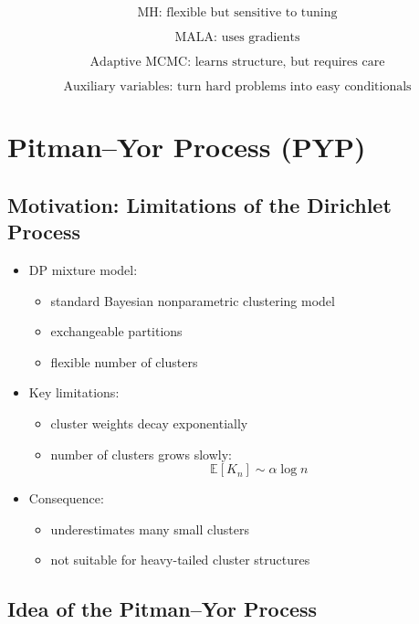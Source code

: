 \documentclass[12pt,oneside]{book}
\numberwithin{equation}{section}
\theoremstyle{definition}
\theoremstyle{plain}
\theoremstyle{remark}
\begin{document}
\[
\text{MH: flexible but sensitive to tuning}
\]

\[
\text{MALA: uses gradients}
\]

\[
\text{Adaptive MCMC: learns structure, but requires care}
\]

\[
\text{Auxiliary variables: turn hard problems into easy conditionals}
\]

\section{Pitman--Yor Process (PYP)}

\subsection*{Motivation: Limitations of the Dirichlet Process}

\begin{itemize}
\item DP mixture model:
\begin{itemize}
\item standard Bayesian nonparametric clustering model
\item exchangeable partitions
\item flexible number of clusters
\end{itemize}

\item Key limitations:
\begin{itemize}
\item cluster weights decay exponentially
\item number of clusters grows slowly:
\[
\mathbb{E}[K_n] \sim \alpha \log n
\]
\end{itemize}

\item Consequence:
\begin{itemize}
\item underestimates many small clusters
\item not suitable for heavy-tailed cluster structures
\end{itemize}
\end{itemize}

\subsection*{Idea of the Pitman--Yor Process}
\end{document}
